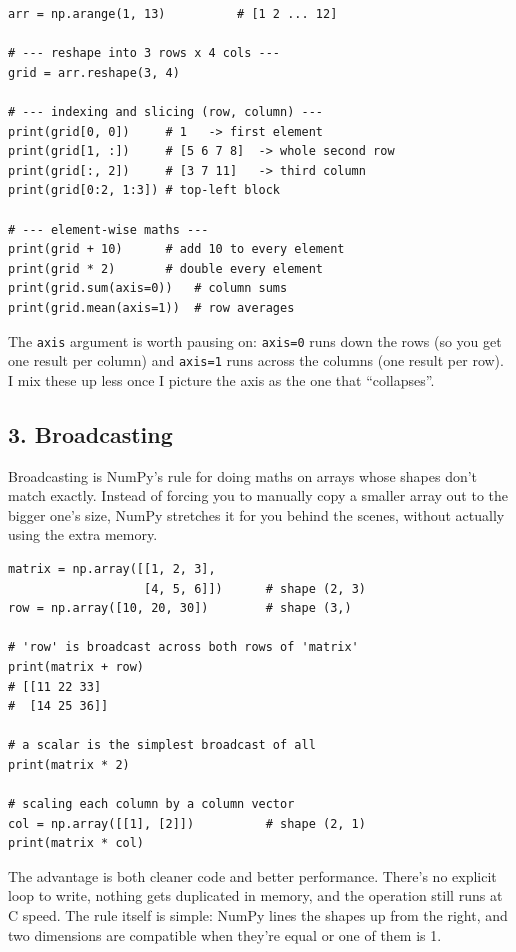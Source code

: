 \documentclass[11pt,a4paper]{article}
\begin{document}
\begin{lstlisting}[style=py, caption={Indexing, slicing, reshaping, and element by element maths.}]
arr = np.arange(1, 13)          # [1 2 ... 12]

# --- reshape into 3 rows x 4 cols ---
grid = arr.reshape(3, 4)

# --- indexing and slicing (row, column) ---
print(grid[0, 0])     # 1   -> first element
print(grid[1, :])     # [5 6 7 8]  -> whole second row
print(grid[:, 2])     # [3 7 11]   -> third column
print(grid[0:2, 1:3]) # top-left block

# --- element-wise maths ---
print(grid + 10)      # add 10 to every element
print(grid * 2)       # double every element
print(grid.sum(axis=0))   # column sums
print(grid.mean(axis=1))  # row averages
\end{lstlisting}

The \texttt{axis} argument is worth pausing on: \texttt{axis=0} runs down the rows (so you get one result per column) and \texttt{axis=1} runs across the columns (one result per row). I mix these up less once I picture the axis as the one that ``collapses''.

\subsection*{3. Broadcasting}
Broadcasting is NumPy's rule for doing maths on arrays whose shapes don't match exactly. Instead of forcing you to manually copy a smaller array out to the bigger one's size, NumPy stretches it for you behind the scenes, without actually using the extra memory.

\begin{lstlisting}[style=py, caption={Broadcasting a 1D array across a 2D array.}]
matrix = np.array([[1, 2, 3],
                   [4, 5, 6]])      # shape (2, 3)
row = np.array([10, 20, 30])        # shape (3,)

# 'row' is broadcast across both rows of 'matrix'
print(matrix + row)
# [[11 22 33]
#  [14 25 36]]

# a scalar is the simplest broadcast of all
print(matrix * 2)

# scaling each column by a column vector
col = np.array([[1], [2]])          # shape (2, 1)
print(matrix * col)
\end{lstlisting}

The advantage is both cleaner code and better performance. There's no explicit loop to write, nothing gets duplicated in memory, and the operation still runs at C speed. The rule itself is simple: NumPy lines the shapes up from the right, and two dimensions are compatible when they're equal or one of them is 1.
\end{document}
